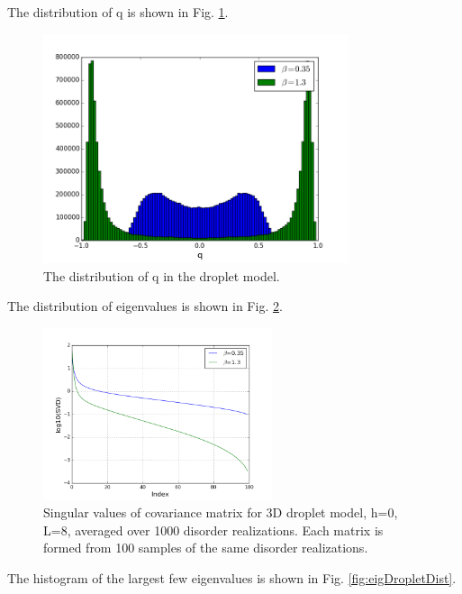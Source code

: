 The distribution of q is shown in Fig. \ref{fig:q_droplet}. 
\begin{figure}[ht]
  \centering
  \includegraphics[width=0.8\textwidth]{img/matrix/q_dist_droplet.png}
  \caption{The distribution of q in the droplet model.}
  \label{fig:q_droplet}
\end{figure}


The distribution of eigenvalues is shown in Fig. \ref{fig:eigDroplet}.

\begin{figure}[ht]
  \centering
  \includegraphics[width=0.6\textwidth]{img/matrix/eigDroplet.png}
  \caption{Singular values of covariance matrix for 3D droplet model, h=0, L=8, 
averaged over 1000 disorder realizations. 
Each matrix is formed from 100 samples of the same disorder realizations.}
  \label{fig:eigDroplet}
\end{figure}

The histogram of the largest few eigenvalues is shown in Fig. \ref{fig:eigDropletDist}.

